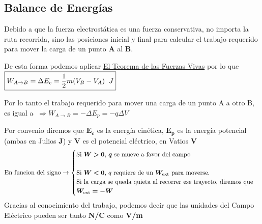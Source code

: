 \subsection{Balance de Energías}
\begin{wrapfigure}{r}{5cm}
        
\end{wrapfigure}
\noindent Debido a que la fuerza electrostática es una fuerza conservativa, no importa la ruta recorrida, sino las posiciones inicial y final para calcular el trabajo requerido para mover la carga de un punto \textbf{A} al \textbf{B}.\par
\vspace{0.5cm}
\hspace{-.725cm}
De esta forma podemos aplicar \underline{El Teorema de las Fuerzas Vivas} por lo que \(\boxed{W_{A \to B} = \Delta E_c = \frac{1}{2} m (V_B -V_A) \hspace{2mm}J}\)
\par
\vspace{0.5cm}
\hspace{-.6cm}
Por lo tanto el trabajo requerido para mover una carga de un punto A a otro B, es igual a \(\ \Rightarrow \boxed{W_{A \to B} =-\Delta E_p = -q \Delta V}\) \par
\vspace{0.5cm}
\noindent Por convenio diremos que  \(\bm{E_c}\) es la energía cinética, \(\bm{E_p}\) es la energía potencial (ambas en Julios \textbf{J}) y \(\bm{V}\) es el potencial eléctrico, en Vatios \textbf{V}
\[
        \textnormal{En funcion del signo} \rightarrow
        \begin{cases}
                \textnormal{Si \(\bm{W > 0}\), \(\bm{q}\) se mueve a favor del campo} \\
                \\
                \textnormal{Si \(\bm{W < 0}\), \(q\) requiere de un \(\bm{W_{\textnormal{ext}}}\) para moverse.}
                \\
                \textnormal{Si la carga se queda quieta al recorrer ese trayecto, diremos que}
                \\
                \textnormal{\(\bm{W_\textnormal{ext} = -W}\)}
        \end{cases}
\]
\noindent Gracias al conocimiento del trabajo, podemos decir que las unidades del Campo Eléctrico pueden ser tanto \textbf{N/C} como \textbf{V/m}
